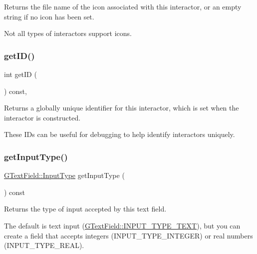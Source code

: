 Returns the file name of the icon associated with this interactor, or an empty string if no icon has been set. 

Not all types of interactors support icons. \mbox{\label{classGInteractor_a9c9659a6c6ba66b4107ba59c95a24241}} 
\subsubsection{\texorpdfstring{get\+I\+D()}{getID()}}
{\footnotesize\ttfamily int get\+ID (\begin{DoxyParamCaption}{ }\end{DoxyParamCaption}) const\hspace{0.3cm}{\ttfamily [virtual]}, {\ttfamily [inherited]}}



Returns a globally unique identifier for this interactor, which is set when the interactor is constructed. 

These I\+Ds can be useful for debugging to help identify interactors uniquely. \mbox{\label{classGTextField_a69cc7c223d780203ab2852ee5a881753}} 
\subsubsection{\texorpdfstring{get\+Input\+Type()}{getInputType()}}
{\footnotesize\ttfamily \mbox{\hyperlink{classGTextField_a5fc772c800c3d40d2b95564e8a839bab}{G\+Text\+Field\+::\+Input\+Type}} get\+Input\+Type (\begin{DoxyParamCaption}{ }\end{DoxyParamCaption}) const\hspace{0.3cm}{\ttfamily [virtual]}}



Returns the type of input accepted by this text field. 

The default is text input (\mbox{\hyperlink{classGTextField_a5fc772c800c3d40d2b95564e8a839babadbd6303eaf17fd7715ddca85f2ac3287}{G\+Text\+Field\+::\+I\+N\+P\+U\+T\+\_\+\+T\+Y\+P\+E\+\_\+\+T\+E\+XT}}), but you can create a field that accepts integers (I\+N\+P\+U\+T\+\_\+\+T\+Y\+P\+E\+\_\+\+I\+N\+T\+E\+G\+ER) or real numbers (I\+N\+P\+U\+T\+\_\+\+T\+Y\+P\+E\+\_\+\+R\+E\+AL). \mbox{\label{classGTextField_a208ce13c1da40bf0ddb509daf99d6588}} 
